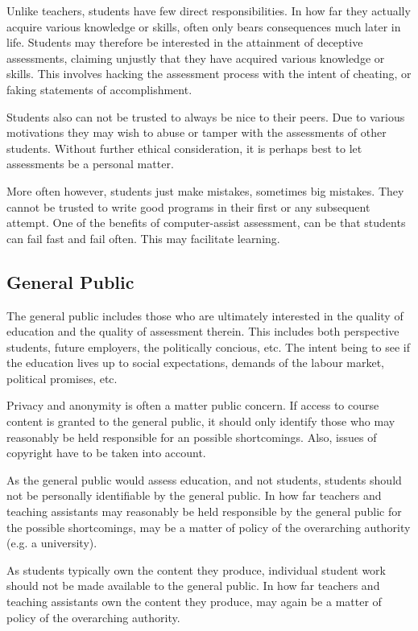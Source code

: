 Unlike teachers, students have few direct responsibilities. In how far they
actually acquire various knowledge or skills, often only bears consequences
much later in life. Students may therefore be interested in the attainment of
deceptive assessments, claiming unjustly that they have acquired various
knowledge or skills. This involves hacking the assessment process with the
intent of cheating, or faking statements of accomplishment.

Students also can not be trusted to always be nice to their peers. Due to
various motivations they may wish to abuse or tamper with the assessments of
other students. Without further ethical consideration, it is perhaps best to
let assessments be a personal matter.

More often however, students just make mistakes, sometimes big mistakes. They
cannot be trusted to write good programs in their first or any subsequent
attempt.  One of the benefits of computer-assist assessment, can be that
students can fail fast and fail often.  This may facilitate learning.

\subsection{General Public}

The general public includes those who are ultimately interested in the quality
of education and the quality of assessment therein. This includes both
perspective students, future employers, the politically concious, etc. The
intent being to see if the education lives up to social expectations, demands
of the labour market, political promises, etc.

Privacy and anonymity is often a matter public concern. If access to course
content is granted to the general public, it should only identify those who may
reasonably be held responsible for an possible shortcomings. Also, issues of
copyright have to be taken into account.

As the general public would assess education, and not students, students should
not be personally identifiable by the general public. In how far teachers and
teaching assistants may reasonably be held responsible by the general public
for the possible shortcomings, may be a matter of policy of the overarching
authority (e.g.  a university).

As students typically own the content they produce, individual student work
should not be made available to the general public. In how far teachers and
teaching assistants own the content they produce, may again be a matter of
policy of the overarching authority.
